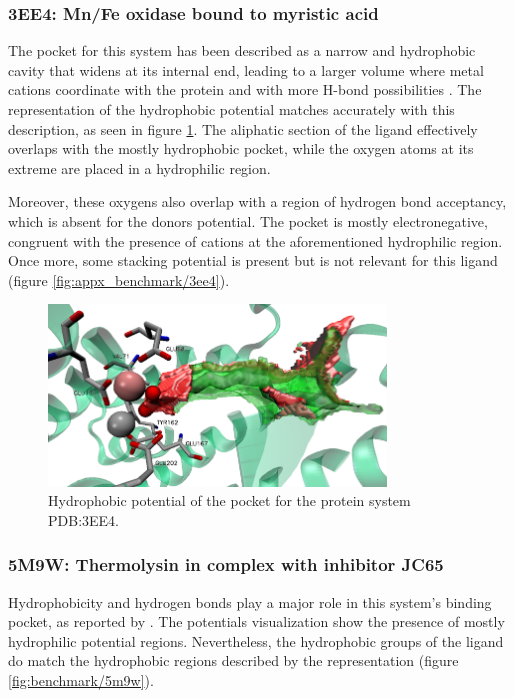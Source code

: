     \subsubsection{3EE4: Mn/Fe oxidase bound to myristic acid}
      The pocket for this system has been described as a narrow and hydrophobic cavity that widens at its internal end, leading to a larger volume where metal cations coordinate with the protein and with more H-bond possibilities \cite{benchmark_hydrophobic_2009}. The representation of the hydrophobic potential matches accurately with this description, as seen in figure \ref{fig:benchmark/3ee4}. The aliphatic section of the ligand effectively overlaps with the mostly hydrophobic pocket, while the oxygen atoms at its extreme are placed in a hydrophilic region.

      Moreover, these oxygens also overlap with a region of hydrogen bond acceptancy, which is absent for the donors potential. The pocket is mostly electronegative, congruent with the presence of cations at the aforementioned hydrophilic region. Once more, some stacking potential is present but is not relevant for this ligand (figure \ref{fig:appx_benchmark/3ee4}).

      \begin{figure}[H]
        \centering
        \includegraphics[width=0.8\textwidth]{figures/results/benchmark_prot/3ee4.png}
        \caption{\label{fig:benchmark/3ee4} Hydrophobic potential of the pocket for the protein system PDB:3EE4.}
      \end{figure}
    \pagebreak

    \subsubsection{5M9W: Thermolysin in complex with inhibitor JC65}
      Hydrophobicity and hydrogen bonds play a major role in this system's binding pocket, as reported by \cite{hydrophobic_2017}. The potentials visualization show the presence of mostly hydrophilic potential regions. Nevertheless, the hydrophobic groups of the ligand do match the hydrophobic regions described by the representation (figure \ref{fig:benchmark/5m9w}).

